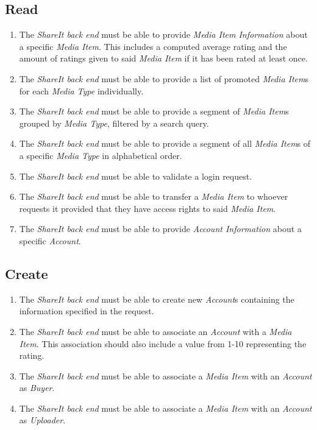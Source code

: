 \documentclass[../report.tex]{subfiles}
\begin{document}
\noindent

\subsection{Read}
\begin{enumerate}[label=FR-\twodigits*, resume]

\item The \textit{ShareIt back end} must be able to provide \textit{Media Item Information} about a specific \textit{Media Item}. This includes a computed average rating and the amount of ratings given to said \textit{Media Item} if it has been rated at least once.

\item The \textit{ShareIt back end} must be able to provide a list of promoted \textit{Media Item}s for each \textit{Media Type} individually.

\item The \textit{ShareIt back end} must be able to provide a segment of \textit{Media Item}s grouped by \textit{Media Type}, filtered by a search query.

\item The \textit{ShareIt back end} must be able to provide a segment of all \textit{Media Item}s of a specific \textit{Media Type} in alphabetical order.

\item The \textit{ShareIt back end} must be able to validate a login request.

\item The \textit{ShareIt back end} must be able to transfer a \textit{Media Item} to whoever requests it provided that they have access rights to said \textit{Media Item}.

\item The \textit{ShareIt back end} must be able to provide \textit{Account Information} about a specific \textit{Account}.

\end{enumerate}
\subsection{Create}
\begin{enumerate}[label=FR-\twodigits*,resume]

\item The \textit{ShareIt back end} must be able to create new \textit{Account}s containing the information specified in the request.

\item The \textit{ShareIt back end} must be able to associate an \textit{Account} with a \textit{Media Item}. This association should also include a value from 1-10 representing the rating.

\item The \textit{ShareIt back end} must be able to associate a \textit{Media Item} with an \textit{Account} as \textit{Buyer}.

\item The \textit{ShareIt back end} must be able to associate a \textit{Media Item} with an \textit{Account} as \textit{Uploader}.

\end{enumerate}
\end{document}
